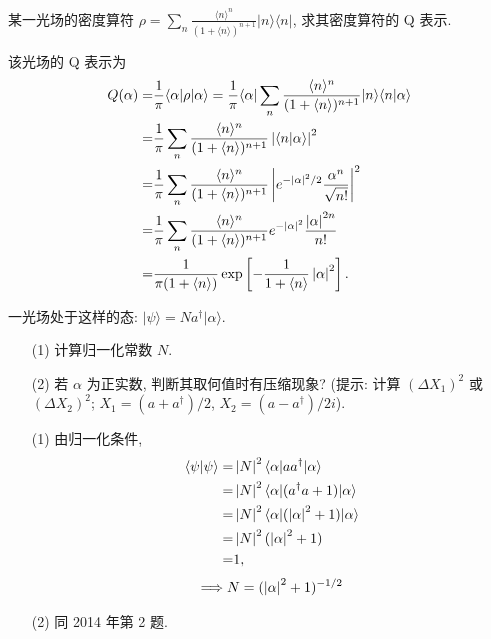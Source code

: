 \documentclass{assignment}
\begin{document}
\begin{prob}
    某一光场的密度算符 $\rho=\sum_n\frac{\langle n\rangle^n}{(1+\langle n\rangle)^{n+1}}\lvert n\rangle\langle n\rvert$, 求其密度算符的 Q 表示.
\end{prob}
\begin{sol}
    该光场的 Q 表示为
    \begin{align}
        \notag Q(\alpha)=&\frac{1}{\pi}\langle\alpha\rvert\rho\lvert\alpha\rangle=\frac{1}{\pi}\langle\alpha\rvert\sum_n\frac{\langle n\rangle^n}{(1+\langle n\rangle)^{n+1}}\lvert n\rangle\langle n\vert\alpha\rangle\\
        \notag=&\frac{1}{\pi}\sum_n\frac{\langle n\rangle^n}{(1+\langle n\rangle)^{n+1}}\left\lvert\langle n\vert\alpha\rangle\right\rvert^2\\
        \notag=&\frac{1}{\pi}\sum_n\frac{\langle n\rangle^n}{(1+\langle n\rangle)^{n+1}}\left\lvert e^{-\left\lvert\alpha\right\rvert^2/2}\frac{\alpha^n}{\sqrt{n!}}\right\rvert^2\\
        \notag=&\frac{1}{\pi}\sum_n\frac{\langle n\rangle^n}{(1+\langle n\rangle)^{n+1}}e^{-\left\lvert\alpha\right\rvert^2}\frac{\left\lvert\alpha\right\rvert^{2n}}{n!}\\
        =&\frac{1}{\pi(1+\langle n\rangle)}\exp\left[-\frac{1}{1+\langle n\rangle}\left\lvert\alpha\right\rvert^2\right].
    \end{align}
\end{sol}

\begin{prob}
    一光场处于这样的态: $\lvert\psi\rangle=Na^{\dagger}\lvert\alpha\rangle$.
    \begin{itemize}
        \item[(1)] 计算归一化常数 $N$.
        \item[(2)] 若 $\alpha$ 为正实数, 判断其取何值时有压缩现象? (提示: 计算 $(\Delta X_1)^2$ 或 $(\Delta X_2)^2$; $X_1=(a+a^{\dagger})/2$, $X_2=(a-a^{\dagger})/2i$).
    \end{itemize}
\end{prob}
\begin{sol}
    \begin{itemize}
        \item[(1)] 由归一化条件,
        \begin{align}
            \notag\langle\psi\vert\psi\rangle=&\left\lvert N\right\rvert^2\langle\alpha\rvert aa^{\dagger}\lvert\alpha\rangle\\
            \notag=&\left\lvert N\right\rvert^2\langle\alpha\rvert(a^{\dagger}a+1)\lvert\alpha\rangle\\
            \notag=&\left\lvert N\right\rvert^2\langle\alpha\rvert(\left\lvert\alpha\right\rvert^2+1)\lvert\alpha\rangle\\
            \notag=&\left\lvert N\right\rvert^2(\left\lvert\alpha\right\rvert^2+1)\\
            =&1,
        \end{align}
        \begin{align}
            \Longrightarrow N=(\left\lvert\alpha\right\rvert^2+1)^{-1/2}
        \end{align}
        \item[(2)] 同 2014 年第 2 题.
    \end{itemize}
\end{sol}
\end{document}
